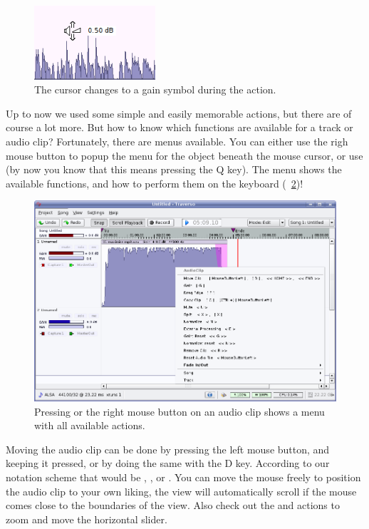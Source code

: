 \begin{figure}
 \centering\includegraphics[width=0.4\textwidth]{images/gain-cursor.png}
 \caption{The cursor changes to a gain symbol during the  action.}
 \label{fig_gaincursor}
\end{figure}

Up to now we used some simple and easily memorable actions, but there are of course a lot more. But how to know which functions are available for a track or audio clip? Fortunately, there are menus available. You can either use the righ mouse button to popup the menu for the object beneath the mouse cursor, or use  (by now you know that this means pressing the Q key). The menu shows the available functions, and how to perform them on the keyboard (\FigB\ \ref{fig_clipmenu})!

\begin{figure}
 \centering\includegraphics[width=\textwidth]{images/clipmenu.png}
 \caption{Pressing  or the right mouse button on an audio clip shows a menu with all available actions.}
 \label{fig_clipmenu}
\end{figure}

Moving the audio clip can be done by pressing the left mouse button, and keeping it pressed, or by doing the same with the D key. According to our notation scheme that would be , , or . You can move the mouse freely to position the audio clip to your own liking, the view will automatically scroll if the mouse comes close to the boundaries of the view. Also check out the  and  actions to zoom and move the horizontal slider.


